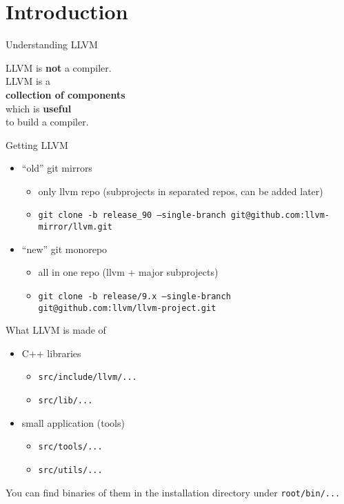 
\section{Introduction}


\begin{frame}{Understanding LLVM}
	\begin{center}
	\huge{
		LLVM is \textbf{not} a compiler.\\
		\pause
		\vfill
		LLVM is a\\\textbf{collection of components}\\
		which is \textbf{useful}\\to build a compiler.
	}
	\end{center}
\end{frame}


\begin{frame}{Getting LLVM}
\begin{itemize}
	\item ``old'' git mirrors
		\begin{itemize}
			\item only llvm repo (subprojects in separated repos, can be added later)
			\item \texttt{git clone -b release\_90 --single-branch git@github.com:llvm-mirror/llvm.git}
		\end{itemize}
	\vfill
	\item ``new'' git monorepo
		\begin{itemize}
			\item all in one repo (llvm + major subprojects)
			\item \texttt{git clone -b release/9.x --single-branch git@github.com:llvm/llvm-project.git}
		\end{itemize}
\end{itemize}
\end{frame}


\begin{frame}{What LLVM is made of}
\begin{itemize}
	\item C++ libraries
		\begin{itemize}
			\item \texttt{src/include/llvm/...}
			\item \texttt{src/lib/...}
		\end{itemize}
		\vfill
	\item small application (tools)
		\begin{itemize}
			\item \texttt{src/tools/...}
			\item \texttt{src/utils/...}
		\end{itemize}
\end{itemize}
\vfill
You can find binaries of them in the installation directory under \texttt{root/bin/...}
\end{frame}


